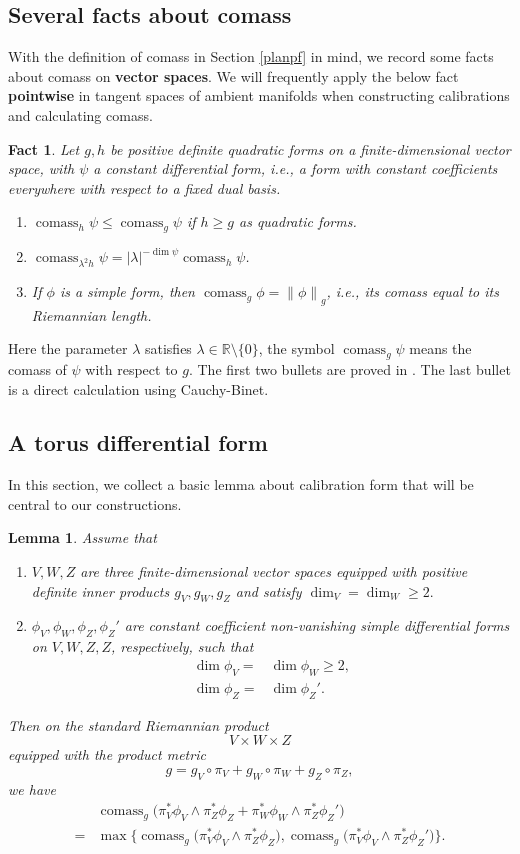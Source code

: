 \documentclass[11pt,a4paper]{amsart}
\numberwithin{equation}{section}
\newcommand{\lam}{\lambda}
\newcommand{\cms}{\operatorname{comass}}
\newcommand{\no}[1]{\left\lVert#1\right\rVert}
\newcommand{\du}{^\ast}
\newcommand{\w}{\wedge}
\newcommand{\R}{\mathbb{R}}
\theoremstyle{plain}
\newtheorem{lem}[exam]{Lemma}
\newtheorem{fact}[exam]{Fact}
\theoremstyle{definition}
\numberwithin{equation}{subsection}
\begin{document}
\subsection{Several facts about comass}
With the definition of comass in Section \ref{planpf} in mind, we record some facts about comass on \textbf{vector spaces}. We will frequently apply the below fact \textbf{pointwise} in tangent spaces of ambient manifolds when constructing calibrations and calculating comass.
\begin{fact}\label{cmsvec}
	Let $g,h$ be positive definite quadratic forms on a finite-dimensional vector space, with $\psi$ a constant differential form, i.e., a form with constant coefficients everywhere with respect to a fixed dual basis.\begin{enumerate}
		\item $\cms_h\psi\le\cms_g\psi$ if $h\ge g$ as quadratic forms.\label{cms1}
		\item $\cms_{\lam^2 h}\psi=|\lam|^{-\dim\psi}\cms_h\psi$.\label{cms2}
			\item If $\phi$ is a simple form, then $\cms_g\phi=\no{\phi}_g$, i.e., its comass equal to its Riemannian length.\label{cms0}
	\end{enumerate}
\end{fact}
Here the parameter $\lam$ satisfies $\lam\in \R\setminus\{0\}$, the symbol
$\cms_g\psi$ means the comass of $\psi$ with respect to $g$. The first two bullets are proved in \cite[Lemma 2.1.9, 2.1.20]{YZt}. The last bullet is a direct calculation using Cauchy-Binet.\subsection{A torus differential form}\label{tof}
In this section, we collect a basic lemma about calibration form that will be central to our constructions.
\begin{lem}
	\label{torf}
	Assume that
	\begin{enumerate}
		\item $V,W,Z$ are three finite-dimensional vector spaces equipped with positive definite inner products $g_V,g_W,g_Z$ and satisfy $\dim_V=\dim_W\ge 2.$
		\item $\phi_V,\phi_W,\phi_Z,\phi_Z'$ are constant coefficient non-vanishing simple differential forms on $V,W,Z,Z$, respectively, such that 
		\begin{align*}
			\dim\phi_V=&\dim\phi_W\ge 2,\\\dim\phi_Z=&\dim\phi_Z'.
		\end{align*}
	\end{enumerate} 
	Then on the standard Riemannian product $$V\times W\times Z$$ equipped with the product metric $$g=g_V\circ\pi_V+g_W\circ\pi_W+g_Z\circ\pi_Z,$$ we have
	\begin{align}
	&	\cms_g \bigg(\pi_V\du\phi_V\w \pi_Z\du\phi_Z+\pi_W\du\phi_W\w\pi_Z\du\phi_Z'\bigg)\\=&\max\bigg\{\cms_{g}\big(\pi_V\du\phi_V\w \pi_Z\du\phi_Z\big),\cms_{g}\big(\pi_V\du\phi_V\w \pi_Z\du\phi_Z'\big)\bigg\}.\label{cmsc}
	\end{align}
\end{lem}
\end{document}
